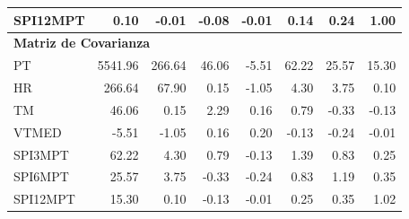\begin{table}[ht]
\begin{tabular}{lrrrrrrr}
SPI12MPT & 0.10 & -0.01 & -0.08 & -0.01 & 0.14 & 0.24 & 1.00 \\
\midrule
\multicolumn{8}{l}{\textbf{Matriz de Covarianza}} \\
\midrule
PT       & 5541.96 & 266.64 & 46.06 & -5.51 & 62.22 & 25.57 & 15.30 \\
HR       & 266.64 & 67.90 & 0.15 & -1.05 & 4.30 & 3.75 & 0.10 \\
TM       & 46.06 & 0.15 & 2.29 & 0.16 & 0.79 & -0.33 & -0.13 \\
VTMED    & -5.51 & -1.05 & 0.16 & 0.20 & -0.13 & -0.24 & -0.01 \\
SPI3MPT  & 62.22 & 4.30 & 0.79 & -0.13 & 1.39 & 0.83 & 0.25 \\
SPI6MPT  & 25.57 & 3.75 & -0.33 & -0.24 & 0.83 & 1.19 & 0.35 \\
SPI12MPT & 15.30 & 0.10 & -0.13 & -0.01 & 0.25 & 0.35 & 1.02 \\
\bottomrule
\end{tabular}
\end{table}



